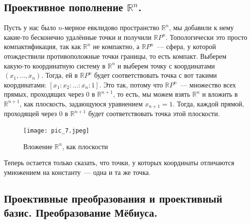 \documentclass[11pt]{report}
\begin{document}
    \subsection{Проективное пополнение $\mathbb{R}^n$.}

    Пусть у нас было $n$-мерное евклидово пространство $\mathbb{R}^n$, мы добавили к нему какие-то бесконечно удалённые точки
    и получили $\mathbb{R}P^n$. Топологически это просто компактификация, так как $\mathbb{R}^n$ не компактно, а $\mathbb{R}P^n$~--- сфера, у которой отождествили противоположные точки границы, то есть компакт.
    Выберем какую-то координатную систему в $ \mathbb{R}^n$ и выберем точку с координатами $(x_1, \ldots, x_n)$.
    Тогда, ей в $\mathbb{R}P^n$ будет соответствовать точка с вот такими координатами: $[x_1 : x_2 : \ldots : x_n : 1]$. Это так, потому что $\mathbb{R}P^n$~--- множество всех прямых, проходящих через 0 в $\mathbb{R}^{n + 1}$, то есть, мы можем взять $\mathbb{R}^n$ и вложить в $\mathbb{R}^{n + 1}$, как плоскость, задающуюся уравнением $x_{n + 1} = 1$. Тогда, каждой прямой, проходящей через 0 в $\mathbb{R}^{n + 1}$ будет соответствовать точка этой плоскости. \\
    \begin{center}
    \begin{figure}[h]
        \centering
        \texttt{[image: pic\_7.jpeg]}
        \caption{Вложение $\mathbb{R}^n$, как плоскости}
    \end{figure}
    \end{center}
    Теперь остается только сказать, что точки, у которых координаты отличаются умножением на константу~--- одна и та же точка.\\

    \subsection{Проективные преобразования и проективный базис. Преобразование Мёбиуса.}
\end{document}
